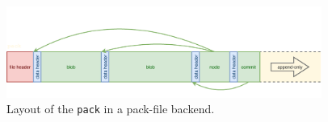 \begin{figure}[ht]
  \caption{Layout of the \texttt{pack} in a pack-file backend.}
  \label{fig:pack}

  \centering
  \vspace{-1em}
  \includegraphics[width=0.92\textwidth]{images/pack.pdf}
\end{figure}
